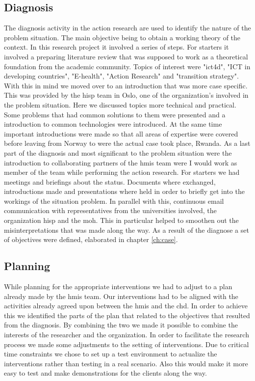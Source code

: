 \subsection{Diagnosis}
The diagnosis activity in the action research are used to identify the nature of the problem situation. 
The main objective being to obtain a working theory of the context.
In this research project it involved a series of steps.
For starters it involved a preparing literature review that was supposed to work as a theoretical foundation from the academic community.
Topics of interest were "ict4d", "ICT in developing countries", "E-health", "Action Research" and "transition strategy".
With this in mind we moved over to an introduction that was more case specific.
This was provided by the \gls{hisp} team in Oslo, one of the organization's involved in the problem situation.
Here we discussed topics more technical and practical. 
Some problems that had common solutions to them were presented and a introduction to common technologies were introduced.
At the same time important introductions were made so that all areas of expertise were covered before leaving from Norway to were the actual case took place, Rwanda.
As a last part of the diagnosis and most significant to the problem situation were the introduction to collaborating partners of the \gls{hmis} team were I would work as member of the team while performing the action research.
For starters we had meetings and briefings about the status. Documents where exchanged, introductions made and presentations where held in order to briefly get into the workings of the situation problem.
In parallel with this, continuous email communication with representatives from the universities involved, the organization \gls{hisp} and the \gls{moh}. This in particular helped to smoothen out the misinterpretations that was made along the way. 
As a result of the diagnose a set of objectives were defined, elaborated in chapter \ref{ch:case}.
\subsection{Planning}
While planning for the appropriate interventions we had to adjust to a plan already made by the \gls{hmis} team.
Our interventions had to be aligned with the activities already agreed upon between the \gls{hmis} and the \gls{chd}.
In order to achieve this we identified the parts of the plan that related to the objectives that resulted from the diagnosis.
By combining the two we made it possible to combine the interests of the researcher and the organization. 
In order to facilitate the research process we made some adjustments to the setting of interventions. 
Due to critical time constraints we chose to set up a test environment to actualize the interventions rather than testing in a real scenario.
Also this would make it more easy to test and make demonstrations for the clients along the way.

